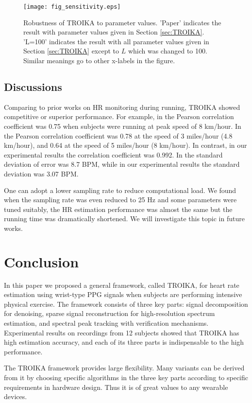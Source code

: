 \documentclass[10pt,twocolumn]{IEEEtran}
\begin{document}
\begin{figure}[t]
\centering
\texttt{[image: fig\_sensitivity.eps]}
\caption{Robustness of TROIKA to parameter values. 'Paper' indicates the result with parameter values given in Section \ref{sec:TROIKA}. 'L=100' indicates the result with all parameter values given in Section \ref{sec:TROIKA} except to $L$ which was changed to 100. Similar meanings go to other x-labels in the figure.}
\label{fig:sensitivity}
\end{figure}






\subsection{Discussions}

Comparing to prior works on HR monitoring during running, TROIKA showed competitive or superior performance. For example, in \cite{poh2010motion} the Pearson correlation coefficient was 0.75 when subjects were running at peak speed of 8 km/hour. In \cite{yousefi2013ANC} the Pearson correlation coefficient was 0.78 at the speed of 3 miles/hour (4.8 km/hour), and 0.64 at the speed of 5 miles/hour (8 km/hour). In contrast, in our experimental results the correlation coefficient was 0.992. In \cite{fukushima2012SpectrumSubtraction} the standard deviation of error was 8.7 BPM, while in our experimental results the standard deviation was 3.07 BPM.

One can adopt a lower sampling rate to reduce computational load. We found when the sampling rate was even reduced to 25 Hz and some parameters were tuned suitably, the HR estimation performance was  almost the same but the running time was dramatically shortened. We will investigate this topic in future works.



\section{Conclusion}

In this paper we proposed a general framework, called TROIKA, for heart rate estimation using wrist-type PPG signals when subjects are performing intensive physical exercise. The framework consists of three key parts: signal decomposition for denoising, sparse signal reconstruction for high-resolution spectrum estimation, and spectral peak tracking with verification mechanisms. Experimental results on recordings from 12 subjects showed that TROIKA has high estimation accuracy, and each of its three parts is indispensable to the high performance.

The TROIKA framework provides large flexibility. Many variants can be derived from it by choosing specific algorithms in the three key parts according to specific requirements in hardware design. Thus it is of great values to any wearable devices.










\end{document}
